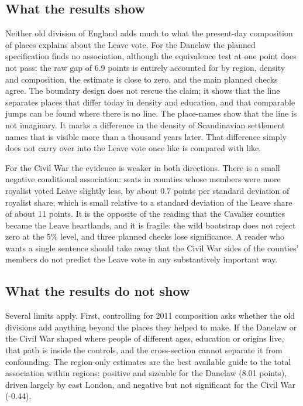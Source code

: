 \documentclass[11pt,a4paper]{article}
\begin{document}
\subsection{What the results show}
Neither old division of England adds much to what the present-day composition of places explains about the Leave vote. For the Danelaw the planned specification finds no association, although the equivalence test at one point does not pass: the raw gap of 6.9 points is entirely accounted for by region, density and composition, the estimate is close to zero, and the main planned checks agree. The boundary design does not rescue the claim; it shows that the line separates places that differ today in density and education, and that comparable jumps can be found where there is no line. The place-names show that the line is not imaginary. It marks a difference in the density of Scandinavian settlement names that is visible more than a thousand years later. That difference simply does not carry over into the Leave vote once like is compared with like.

For the Civil War the evidence is weaker in both directions. There is a small negative conditional association: seats in counties whose members were more royalist voted Leave slightly less, by about 0.7 points per standard deviation of royalist share, which is small relative to a standard deviation of the Leave share of about 11 points. It is the opposite of the reading that the Cavalier counties became the Leave heartlands, and it is fragile: the wild bootstrap does not reject zero at the 5\% level, and three planned checks lose significance. A reader who wants a single sentence should take away that the Civil War sides of the counties' members do not predict the Leave vote in any substantively important way.

\subsection{What the results do not show}
Several limits apply. First, controlling for 2011 composition asks whether the old divisions add anything beyond the places they helped to make. If the Danelaw or the Civil War shaped where people of different ages, education or origins live, that path is inside the controls, and the cross-section cannot separate it from confounding. The region-only estimates are the best available guide to the total association within regions: positive and sizeable for the Danelaw (8.01 points), driven largely by east London, and negative but not significant for the Civil War (-0.44).
\end{document}
